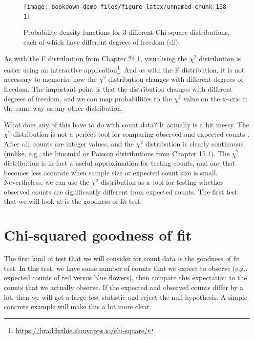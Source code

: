 \documentclass[
]{scrbook}
\begin{document}
\begin{figure}
\texttt{[image: bookdown-demo\_files/figure-latex/unnamed-chunk-138-1]} \caption{Probability density functions for 3 different Chi-square distributions, each of which have different degrees of freedom (df).}\label{fig:unnamed-chunk-138}
\end{figure}

As with the F distribution from \protect\hyperlink{the-f-distribution}{Chapter 24.1}, visualising the \(\chi^{2}\) distribution is easier using an interactive application\footnote{\url{https://bradduthie.shinyapps.io/chi-square/}}.
And as with the F distribution, it is not necessary to memorise how the \(\chi^{2}\) distribution changes with different degrees of freedom.
The important point is that the distribution changes with different degrees of freedom, and we can map probabilities to the \(\chi^{2}\) value on the x-axis in the same way as any other distribution.

What does any of this have to do with count data? It actually is a bit messy.
The \(\chi^{2}\) distribution is not a perfect tool for comparing observed and expected counts \citep{Sokal1995}.
After all, counts are integer values, and the \(\chi^{2}\) distribution is clearly continuous (unlike, e.g., the binomial or Poisson distributions from \protect\hyperlink{ux5cux23probability-distributions}{Chapter 15.4}).
The \(\chi^{2}\) distribution is in fact a useful approximation for testing counts, and one that becomes less accurate when sample size \citep{Slakter1968} or expected count size \citep{Tate1973} is small.
Nevertheless, we can use the \(\chi^{2}\) distribution as a tool for testing whether observed counts are significantly different from expected counts.
The first test that we will look at is the goodness of fit test.

\hypertarget{chi-squared-goodness-of-fit}{%
\section{Chi-squared goodness of fit}\label{chi-squared-goodness-of-fit}}

The first kind of test that we will consider for count data is the goodness of fit test.
In this test, we have some number of counts that we expect to observe (e.g., expected counts of red versus blue flowers), then compare this expectation to the counts that we actually observe.
If the expected and observed counts differ by a lot, then we will get a large test statistic and reject the null hypothesis.
A simple concrete example will make this a bit more clear.
\end{document}
